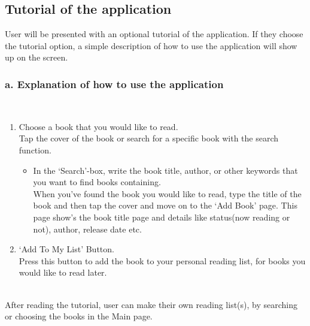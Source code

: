 \documentclass[conference]{IEEEtran}
\begin{document}
\subsection{Tutorial of the application}
User will be presented with an optional tutorial of the application. If they choose the tutorial option, a simple description of how to use the application will show up on the screen. \\

\subsubsection*{a. Explanation of how to use the application}\hfill\\
\begin{enumerate}
    \item Choose a book that you would like to read. \\
    Tap the cover of the book or search for a specific book with the search function.
    \begin{itemize}
        \item In the ‘Search’-box, write the book title, author, or other keywords that you want to find books containing. \\
        When you’ve found the book you would like to read, type the title of the book and then tap the cover and move on to the ‘Add Book’ page. This page show’s the book title page and details like status(now reading or not), author, release date etc.
    \end{itemize}
    \item ‘Add To My List’ Button. \\
    Press this button to add the book to your personal reading list, for books you would like to read later.
\end{enumerate} \hfill\\
After reading the tutorial, user can make their own reading list(s), by searching or choosing the books in the Main page. \\
\end{document}
